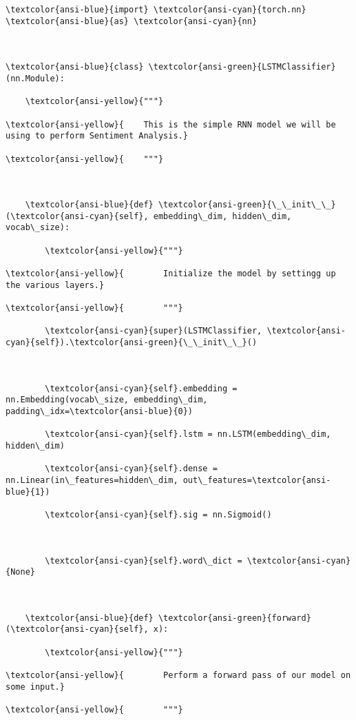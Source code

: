 \documentclass[11pt]{article}
\begin{document}
    \begin{Verbatim}[commandchars=\\\{\}]
\textcolor{ansi-blue}{import} \textcolor{ansi-cyan}{torch.nn} \textcolor{ansi-blue}{as} \textcolor{ansi-cyan}{nn}



\textcolor{ansi-blue}{class} \textcolor{ansi-green}{LSTMClassifier}(nn.Module):

    \textcolor{ansi-yellow}{"""}

\textcolor{ansi-yellow}{    This is the simple RNN model we will be using to perform Sentiment Analysis.}

\textcolor{ansi-yellow}{    """}



    \textcolor{ansi-blue}{def} \textcolor{ansi-green}{\_\_init\_\_}(\textcolor{ansi-cyan}{self}, embedding\_dim, hidden\_dim, vocab\_size):

        \textcolor{ansi-yellow}{"""}

\textcolor{ansi-yellow}{        Initialize the model by settingg up the various layers.}

\textcolor{ansi-yellow}{        """}

        \textcolor{ansi-cyan}{super}(LSTMClassifier, \textcolor{ansi-cyan}{self}).\textcolor{ansi-green}{\_\_init\_\_}()



        \textcolor{ansi-cyan}{self}.embedding = nn.Embedding(vocab\_size, embedding\_dim, padding\_idx=\textcolor{ansi-blue}{0})

        \textcolor{ansi-cyan}{self}.lstm = nn.LSTM(embedding\_dim, hidden\_dim)

        \textcolor{ansi-cyan}{self}.dense = nn.Linear(in\_features=hidden\_dim, out\_features=\textcolor{ansi-blue}{1})

        \textcolor{ansi-cyan}{self}.sig = nn.Sigmoid()

        

        \textcolor{ansi-cyan}{self}.word\_dict = \textcolor{ansi-cyan}{None}



    \textcolor{ansi-blue}{def} \textcolor{ansi-green}{forward}(\textcolor{ansi-cyan}{self}, x):

        \textcolor{ansi-yellow}{"""}

\textcolor{ansi-yellow}{        Perform a forward pass of our model on some input.}

\textcolor{ansi-yellow}{        """}


\end{Verbatim}
\end{document}
